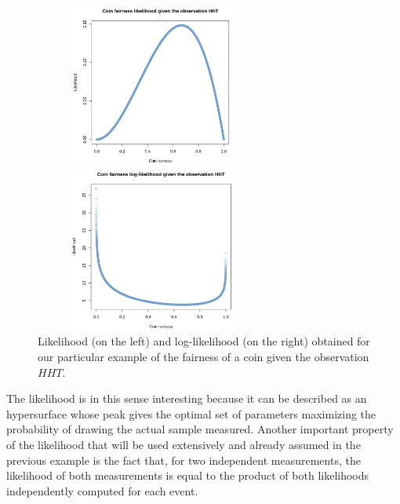 \documentclass[a4paper, 11pt]{report}
\begin{document}
\begin{figure}[htbp]
\centering
\begin{minipage}[b]{.49\textwidth}
\includegraphics[width=7.8cm, height=5.4cm]{figs/likelihood.png}
\end{minipage}\hfill
\begin{minipage}[b]{.49\textwidth}
\includegraphics[width=7.8cm, height=5.4cm]{figs/loglikelihood.png}
\end{minipage} \hfill
\caption{Likelihood (on the left) and log-likelihood (on the right) obtained for our particular example of the fairness of a coin given the observation $HHT$.}
\label{fig:likelihoodEx}
\end{figure}

The likelihood is in this sense interesting because it can be described as an hypersurface whose peak gives the optimal set of parameters maximizing the probability of drawing the actual sample measured. Another important property of the likelihood that will be used extensively and already assumed in the previous example is the fact that, for two independent measurements, the likelihood of both measurements is equal to the product of both likelihoods independently computed for each event.
\end{document}
